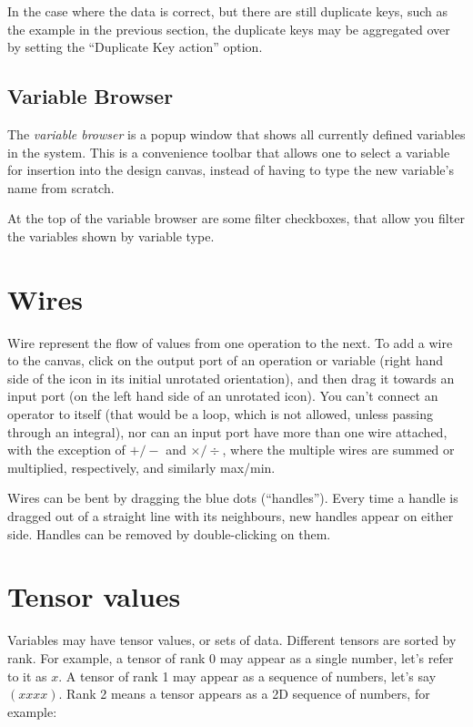 In the case where the data is correct, but there are still duplicate
keys, such as the example in the previous section, the duplicate keys
may be aggregated over by setting the ``Duplicate Key action'' option.

\subsection{Variable Browser}\label{VariableBrowser}

The {\em variable browser} is a popup window that shows all currently
defined variables in the system. This is a convenience toolbar that
allows one to select a variable for insertion into the design canvas,
instead of having to type the new variable's name from scratch.

At the top of the variable browser are some filter checkboxes, that
allow you filter the variables shown by variable type.

\section{Wires}

Wire represent the flow of values from one operation to the next. To
add a wire to the canvas, click on the output port of an operation or
variable (right hand side of the icon in its initial unrotated
orientation), and then drag it towards an input port (on the left hand
side of an unrotated icon). You can't connect an operator to itself
(that would be a loop, which is not allowed, unless passing through an
integral), nor can an input port have more than one wire attached,
with the exception of $+/-$ and $\times/\div$, where the multiple
wires are summed or multiplied, respectively, and similarly max/min.

Wires can be bent by dragging the blue dots (``handles''). Every time
a handle is dragged out of a straight line with its neighbours, new
handles appear on either side. Handles can be removed by
double-clicking on them.

\section{Tensor values}\label{tensors}

Variables may have tensor values, or sets of data. Different tensors
are sorted by rank. For example, a tensor of rank 0 may appear as a
single number, let's refer to it as $x$. A tensor of rank 1 may appear
as a sequence of numbers, let's say $(x x x x)$. Rank 2 means a tensor
appears as a 2D sequence of numbers, for example:

